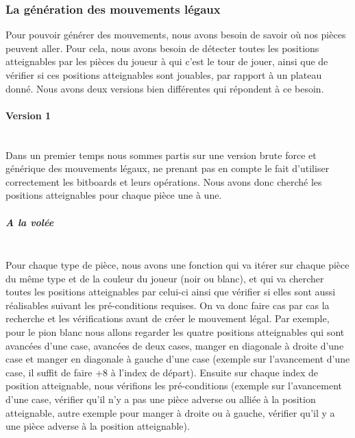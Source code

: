\huge\documentclass{article}
\begin{document}
\subsubsection{La génération des mouvements légaux}
Pour pouvoir générer des mouvements, nous avons besoin de savoir où nos pièces peuvent aller.
Pour cela, nous avons besoin de détecter toutes les positions atteignables par les pièces du joueur à qui c’est le tour de jouer, ainsi que de vérifier si ces positions atteignables sont jouables, par rapport à un plateau donné.
Nous avons deux versions bien différentes qui répondent à ce besoin.

\paragraph{Version 1} \label{mouvements_legaux_v1}
~~\\
\newline
Dans un premier temps nous sommes partis sur une version brute force et générique des mouvements légaux, ne prenant pas en compte le fait d’utiliser correctement les bitboards \cite{Bitboards} et leurs opérations.
Nous avons donc cherché les positions atteignables pour chaque pièce une à une.

\subparagraph{A la volée}
~~\\
\newline
Pour chaque type de pièce, nous avons une fonction qui va itérer sur chaque pièce du même type et de la couleur du joueur (noir ou blanc), et qui va chercher toutes les positions atteignables par celui-ci ainsi que vérifier si elles sont aussi réalisables suivant les pré-conditions requises.
On va donc faire cas par cas la recherche et les vérifications avant de créer le mouvement légal.
Par exemple, pour le pion blanc nous allons regarder les quatre positions atteignables qui sont avancées d'une case, avancées de deux cases, manger en diagonale à droite d'une case et manger en diagonale à gauche d'une case (exemple sur l'avancement d'une case, il suffit de faire +8 à l'index de départ).
Ensuite sur chaque index de position atteignable, nous vérifions les pré-conditions (exemple sur l'avancement d'une case, vérifier qu'il n'y a pas une pièce adverse ou alliée à la position atteignable, autre exemple pour manger à droite ou à gauche, vérifier qu'il y a une pièce adverse à la position atteignable).
\end{document}

